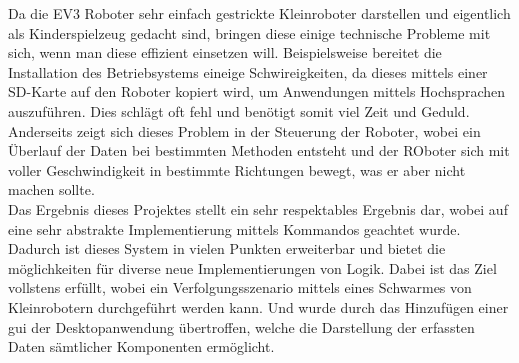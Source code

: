 \noindent
Da die EV3 Roboter sehr einfach gestrickte Kleinroboter darstellen und eigentlich als Kinderspielzeug gedacht sind, bringen diese einige technische Probleme mit sich, wenn man diese effizient einsetzen will. Beispielsweise bereitet die Installation des Betriebsystems eineige Schwireigkeiten, da dieses mittels einer SD-Karte auf den Roboter kopiert wird, um Anwendungen mittels Hochsprachen auszuführen. Dies schlägt oft fehl und benötigt somit viel Zeit und Geduld. Anderseits zeigt sich dieses Problem in der Steuerung der Roboter, wobei ein Überlauf der Daten bei bestimmten Methoden entsteht und der ROboter sich mit voller Geschwindigkeit in bestimmte Richtungen bewegt, was er aber nicht machen sollte.\\

\noindent
Das Ergebnis dieses Projektes stellt ein sehr respektables Ergebnis dar, wobei auf eine sehr abstrakte Implementierung mittels Kommandos geachtet wurde. Dadurch ist dieses System in vielen Punkten erweiterbar und bietet die möglichkeiten für diverse neue Implementierungen von Logik. Dabei ist das Ziel vollstens erfüllt, wobei ein Verfolgungsszenario mittels eines Schwarmes von Kleinrobotern durchgeführt werden kann. Und wurde durch das Hinzufügen einer \gls{gui} der Desktopanwendung übertroffen, welche die Darstellung der erfassten Daten sämtlicher Komponenten ermöglicht.